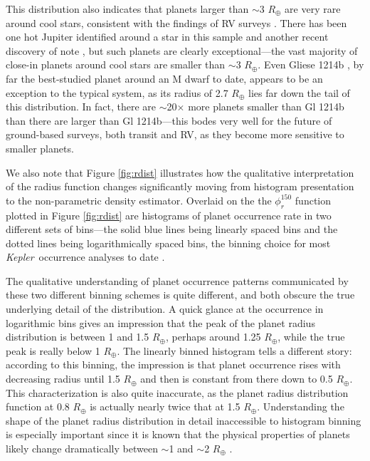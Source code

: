 \documentclass[iop]{emulateapj}
\def\Kepler{\textit{Kepler}}
\def\Rearth{R_\oplus}
\begin{document}
This distribution also indicates that planets larger than $\sim$3 $\Rearth$ are very rare around cool stars, consistent with the findings of RV surveys \citep{endl2003,johnson2010a,johnson2010c,bonfils2013}.   There has been one hot Jupiter identified around a star in this sample \citep[KOI-254b/Kepler-45b][]{johnson2012} and another recent discovery of note \citep{triaud2013}, but such planets are clearly exceptional---the vast majority of close-in planets around cool stars are smaller than $\sim$3 $\Rearth$.  Even Gliese 1214b \citep{charbonneau2009}, by far the best-studied planet around an M dwarf to date, appears to be an exception to the typical system, as its radius of 2.7 $\Rearth$ lies far down the tail of this distribution.  In fact, there are $\sim$20$\times$ more planets smaller than Gl 1214b than there are larger than Gl 1214b---this bodes very well for the future of ground-based surveys, both transit and RV, as they become more sensitive to smaller planets.  


We also note that Figure \ref{fig:rdist} illustrates how the qualitative interpretation of the radius function changes significantly moving from histogram presentation to the non-parametric density estimator.  Overlaid on the the $\phi_r^{150}$ function plotted in Figure \ref{fig:rdist} are histograms of planet occurrence rate in two different sets of bins---the solid blue lines being linearly spaced bins and the dotted lines being logarithmically spaced bins, the binning choice for most \Kepler\ occurrence analyses to date \cite{howard2012,dong2012,dressing2013,fressin2013,petigura2013, petigura2013b}.  

The qualitative understanding of planet occurrence patterns communicated by these two different binning schemes is quite different, and both obscure the true underlying detail of the distribution.  A quick glance at the occurrence in logarithmic bins gives an impression that the peak of the planet radius distribution is between 1 and 1.5 $\Rearth$, perhaps around 1.25 $\Rearth$, while the true peak is really below 1 $\Rearth$.  The linearly binned histogram tells a different story: according to this binning, the impression is that planet occurrence rises with decreasing radius until 1.5 $\Rearth$ and then is constant from there down to 0.5 $\Rearth$.  This characterization is also quite inaccurate, as the planet radius distribution function at 0.8 $\Rearth$ is actually nearly twice that at 1.5 $\Rearth$.  Understanding the shape of the planet radius distribution in detail inaccessible to histogram binning is especially important since it is known that the physical properties of planets likely change dramatically between $\sim$1 and $\sim$2 $\Rearth$ \citep{weiss2014,marcy2014,lopez2013}.
\end{document}
